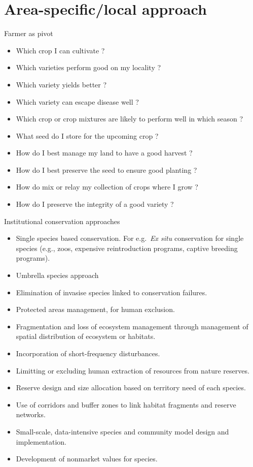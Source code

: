 \documentclass[
  ignorenonframetext,
  aspectratio=169]{beamer}
\providecommand{\tightlist}{%
  \setlength{\itemsep}{0pt}\setlength{\parskip}{0pt}}
\begin{document}
\hypertarget{area-specificlocal-approach}{%
\section{Area-specific/local
approach}\label{area-specificlocal-approach}}

\begin{frame}{Farmer as pivot}
\protect\hypertarget{farmer-as-pivot}{}
\begin{itemize}
\tightlist
\item
  Which crop I can cultivate ?
\item
  Which varieties perform good on my locality ?
\item
  Which variety yields better ?
\item
  Which variety can escape disease well ?
\item
  Which crop or crop mixtures are likely to perform well in which season
  ?
\item
  What seed do I store for the upcoming crop ?
\item
  How do I best manage my land to have a good harvest ?
\item
  How do I best preserve the seed to ensure good planting ?
\item
  How do mix or relay my collection of crops where I grow ?
\item
  How do I preserve the integrity of a good variety ?
\end{itemize}
\end{frame}

\begin{frame}{Institutional conservation approaches}
\protect\hypertarget{institutional-conservation-approaches}{}
\begin{itemize}
\tightlist
\item
  Single species based conservation. For e.g.~\emph{Ex situ}
  conservation for single species (e.g., zoos, expensive reintroduction
  programs, captive breeding programs).
\item
  Umbrella species approach
\item
  Elimination of invasise species linked to conservation failures.
\item
  Protected areas management, for human exclusion.
\item
  Fragmentation and loss of ecosystem management through management of
  spatial distribution of ecosystem or habitats.
\item
  Incorporation of short-frequency disturbances.
\item
  Limitting or excluding human extraction of resources from nature
  reserves.
\item
  Reserve design and size allocation based on territory need of each
  species.
\item
  Use of corridors and buffer zones to link habitat fragments and
  reserve networks.
\item
  Small-scale, data-intensive species and community model design and
  implementation.
\item
  Development of nonmarket values for species.
\end{itemize}
\end{frame}
\end{document}
